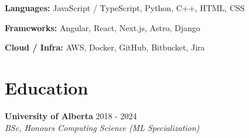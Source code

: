 \documentclass[10pt,letterpaper]{article}
\newcommand{\resumeHeading}[4]{\textbf{#1} \hfill \textcolor{gray}{\scriptsize #4}\hspace{0.35em}#3\\\textit{#2}}
\begin{document}
\textbf{Languages:}
JavaScript / TypeScript, Python, C++, HTML, CSS

\textbf{Frameworks:}
Angular, React, Next.js, Astro, Django

\textbf{Cloud / Infra:}
AWS, Docker, GitHub, Bitbucket, Jira

\section{Education}

\resumeHeading
{University of Alberta}
{BSc, Honours Computing Science (ML Specialization)}
{2018 - 2024}
{}
\end{document}
